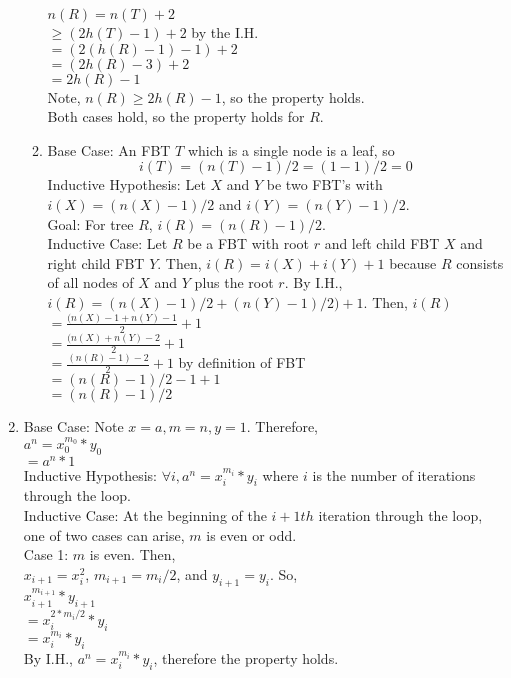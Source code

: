 \documentclass{article}
\begin{document}
\begin{enumerate}
\begin{enumerate}
		$n(R)=n(T)+2$\\ 
		$\geq(2h(T)-1)+2$ by the I.H.\\
		$=(2(h(R)-1)-1)+2$\\
		$=(2h(R)-3)+2$\\
		$=2h(R)-1$\\
		Note, $n(R)\geq2h(R)-1$, so the property holds.\\
		Both cases hold, so the property holds for $R$.
		\item Base Case: An FBT $T$ which is a single node is a leaf, so \[i(T)=(n(T)-1)/2=(1-1)/2=0\]
		Inductive Hypothesis: Let $X$ and $Y$ be two FBT's with $i(X)=(n(X)-1)/2$ and 
		$i(Y)=(n(Y)-1)/2$.\\
		Goal: For tree $R$, $i(R)=(n(R)-1)/2$.\\
		Inductive Case: Let $R$ be a FBT with root $r$ and left child FBT $X$ and right child FBT $Y$. 
		Then, $i(R)=i(X)+i(Y)+1$ because $R$ consists of all nodes of $X$ and $Y$ plus the root $r$.
		By I.H., \\$i(R)=(n(X)-1)/2+(n(Y)-1)/2)+1$. Then, $i(R)$\\
		$=\frac{(n(X)-1+n(Y)-1}{2}+1$\\
		$=\frac{(n(X)+n(Y)-2}{2}+1$\\
		$=\frac{(n(R)-1)-2}{2}+1$ by definition of FBT\\
		$=(n(R)-1)/2-1+1$\\
		$=(n(R)-1)/2$\\
		\end{enumerate}
		\item Base Case: Note $x=a, m=n, y=1$. Therefore, \\
		$a^n=x^{m_0}_0*y_0$\\
		$=a^n*1$\\
		Inductive Hypothesis: $\forall i, a^n=x^{m_i}_i*y_i$
		where $i$ is the number of iterations through the loop.\\
		Inductive Case: At the beginning of the $i+1th$ iteration through the loop, 
		one of two cases can arise, $m$ is even or odd.\\
		Case 1: $m$ is even.  Then, \\
		$x_{i+1}=x_i^2$, $m_{i+1}=m_i/2$, and $y_{i+1}=y_i$. So,\\
		$x_{i+1}^{m_{i+1}}*y_{i+1}$\\
		$=x_i^{2*m_i/2}*y_i$\\
		$=x_i^{m_i}*y_i$\\
		By I.H., $a^n=x^{m_i}_i*y_i$, therefore the property holds.\\

\end{enumerate}
\end{document}

